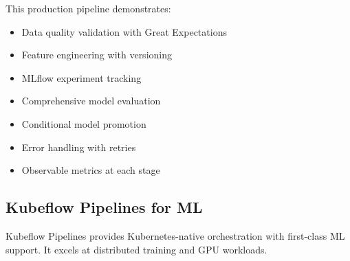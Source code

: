 This production pipeline demonstrates:
\begin{itemize}
    \item Data quality validation with Great Expectations
    \item Feature engineering with versioning
    \item MLflow experiment tracking
    \item Comprehensive model evaluation
    \item Conditional model promotion
    \item Error handling with retries
    \item Observable metrics at each stage
\end{itemize}

\subsection{Kubeflow Pipelines for ML}

Kubeflow Pipelines provides Kubernetes-native orchestration with first-class ML support. It excels at distributed training and GPU workloads.

